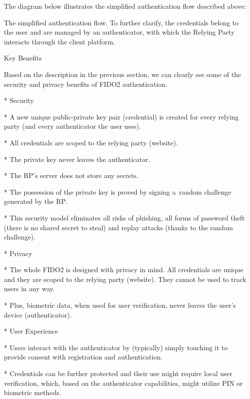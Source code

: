 The diagram below illustrates the simplified authentication flow described above:

The simplified authentication flow. To further clarify, the credentials belong to the user and are managed by an authenticator, with which the Relying Party interacts through the client platform.

\sec Key Benefits

Based on the description in the previous section, we can clearly see some of the security and privacy benefits of FIDO2 authentication.

\begitems

* {\sbf Security}

\begitems

* A new unique public-private key pair (credential) is created for every relying party (and every authenticator the user uses).

* All credentials are scoped to the relying party (website).

* The private key never leaves the authenticator.

* The RP's server does not store any secrets.

* The possession of the private key is proved by signing a~random challenge generated by the RP.

* This security model {\sbf eliminates all risks of phishing, all forms of password theft} (there is {\sbf no shared secret to steal}) and {\sbf replay attacks} (thanks to the random challenge).

\enditems

* {\sbf Privacy}

\begitems

* The whole FIDO2 is designed with privacy in mind. All credentials are unique and they are scoped to the relying party (website). They cannot be used to track users in any way.

* Plus, biometric data, when used for user verification, never leaves the user's device (authenticator).

\enditems

* {\sbf User Experience}

\begitems

* Users interact with the authenticator by (typically) simply touching it to provide consent with registration and authentication.

* Credentials can be further protected and their use might require local user verification, which, based on the authenticator capabilities, might utilize PIN or biometric methods.

